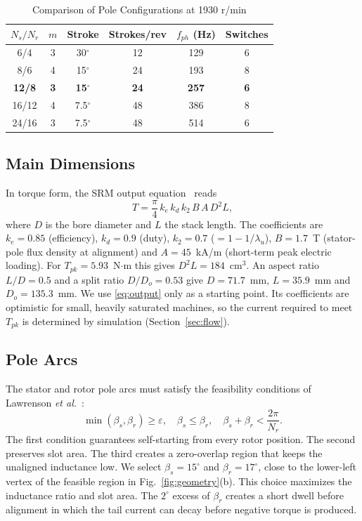 \documentclass[journal]{IEEEtran}
\begin{document}
\begin{table}[!t]
\caption{Comparison of Pole Configurations at 1930 r/min}
\label{tab:poles}
\centering
\renewcommand{\arraystretch}{1.1}
\begin{tabular}{c c c c c c}
\hline
$N_s/N_r$ & $m$ & Stroke & Strokes/rev & $f_{ph}$ (Hz) & Switches\\
\hline
6/4 & 3 & 30$^\circ$ & 12 & 129 & 6\\
8/6 & 4 & 15$^\circ$ & 24 & 193 & 8\\
\textbf{12/8} & \textbf{3} & \textbf{15$^\circ$} & \textbf{24} & \textbf{257} & \textbf{6}\\
16/12 & 4 & 7.5$^\circ$ & 48 & 386 & 8\\
24/16 & 3 & 7.5$^\circ$ & 48 & 514 & 6\\
\hline
\end{tabular}
\end{table}

\subsection{Main Dimensions}
In torque form, the SRM output equation~\cite{krishnan2001,krishnan1988} reads
\begin{equation}
T = \frac{\pi}{4}\,k_e\,k_d\,k_2\,B\,A\,D^2L,
\label{eq:output}
\end{equation}
where $D$ is the bore diameter and $L$ the stack length. The coefficients are
$k_e=0.85$ (efficiency), $k_d=0.9$ (duty), $k_2=0.7$ ($=1-1/\lambda_u$), $B=1.7$~T
(stator-pole flux density at alignment) and $A=45$~kA/m (short-term peak electric
loading). For $T_{pk}=5.93$~N$\cdot$m this gives $D^2L=184$~cm$^3$. An aspect
ratio $L/D=0.5$ and a split ratio $D/D_o=0.53$ give $D=71.7$~mm,
$L=35.9$~mm and $D_o=135.3$~mm. We use \eqref{eq:output} only as a starting
point. Its coefficients are optimistic for small, heavily saturated machines,
so the current required to meet $T_{pk}$ is determined by simulation
(Section~\ref{sec:flow}).

\subsection{Pole Arcs}
The stator and rotor pole arcs must satisfy the feasibility conditions of
Lawrenson \emph{et al.}~\cite{lawrenson1980}:
\begin{equation}
\min(\beta_s,\beta_r)\ge \varepsilon, \quad \beta_s\le\beta_r, \quad \beta_s+\beta_r<\frac{2\pi}{N_r}.
\label{eq:lawrenson}
\end{equation}
The first condition guarantees self-starting from every rotor position. The
second preserves slot area. The third creates a zero-overlap region that keeps
the unaligned inductance low. We select $\beta_s=15^\circ$ and $\beta_r=17^\circ$,
close to the lower-left vertex of the feasible region in Fig.~\ref{fig:geometry}(b).
This choice maximizes the inductance ratio and slot area. The $2^\circ$
excess of $\beta_r$ creates a short dwell before alignment in which the
tail current can decay before negative torque is produced.
\end{document}
